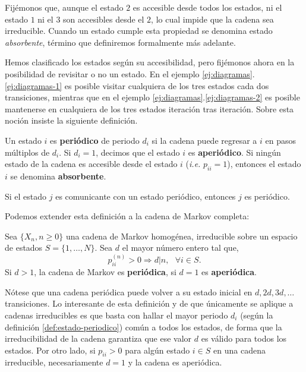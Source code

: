 \begin{ejemplo}
\begin{enumerate}
        Fijémonos que, aunque el estado $2$ es accesible desde todos los estados, ni el estado $1$ ni el $3$ son accesibles desde el $2$, lo cual impide que la cadena sea irreducible. Cuando un estado cumple esta propiedad se denomina estado \textit{absorbente}, término que definiremos formalmente más adelante.
    \end{enumerate}
    \label{ej:diagramas}
\end{ejemplo}


Hemos clasificado los estados según su accesibilidad, pero fijémonos ahora en la posibilidad de revisitar o no un estado. En el ejemplo \ref{ej:diagramas}.\ref{ej:diagramas-1} es posible visitar cualquiera de los tres estados cada dos transiciones, mientras que en el ejemplo \ref{ej:diagramas}.\ref{ej:diagramas-2} es posible mantenerse en cualquiera de los tres estados iteración tras iteración. Sobre esta noción insiste la siguiente definición.

\begin{definicion}
    \label{def:estado-periodico}
    Un estado $i$ es \textbf{periódico} de periodo $d_i$ si la cadena puede regresar a $i$ en pasos múltiplos de $d_i$. Si $d_i=1$, decimos que el estado $i$ es \textbf{aperiódico}. Si ningún estado de la cadena es accesible desde el estado $i$ (\textit{i.e.} $p_{ii}=1$), entonces el estado $i$ se denomina \textbf{absorbente}.
\end{definicion}

\begin{observacion}
    Si el estado $j$ es comunicante con un estado periódico, entonces $j$ es periódico.
\end{observacion}

Podemos extender esta definición a la cadena de Markov completa:

\begin{definicion}
    Sea $\{X_n,n\geq 0\}$ una cadena de Markov homogénea, irreducible sobre un espacio de estados $S=\{1,\dots,N\}$. Sea $d$ el mayor número entero tal que, 
    \begin{equation}
        \label{eq:cond-periodica}
        p_{ii}^{(n)}>0 \Rightarrow d|n, \ \ \ \forall i\in S.
    \end{equation}
    Si $d>1$, la cadena de Markov es \textbf{periódica}, si $d=1$ es \textbf{aperiódica}.
\end{definicion}
Nótese que una cadena periódica puede volver a su estado inicial en $d,2d,3d,\dots$ transiciones. Lo interesante de esta definición y de que únicamente se aplique a cadenas irreducibles es que basta con hallar el mayor periodo $d_i$ (según la definición \ref{def:estado-periodico}) común a todos los estados, de forma que la irreducibilidad de la cadena garantiza que ese valor $d$ es válido para todos los estados. Por otro lado, si $p_{ii}>0$ para algún estado $i\in S$ en una cadena irreducible, necesariamente $d=1$ y la cadena es aperiódica.

